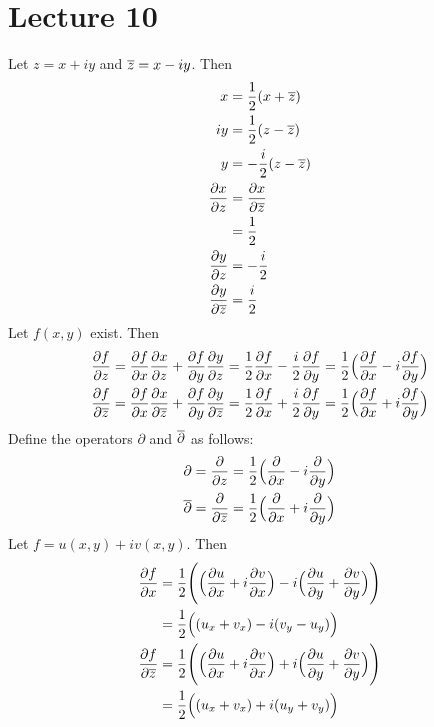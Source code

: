 \documentclass[12pt]{article}
\begin{document}
\section{Lecture 10} 
Let $z = x + iy$ and $\overline{z} = x - iy$. Then $$ \begin{aligned} x &= \frac{1}{2}(x + \overline{z}) \\ iy &= \frac{1}{2}(z - \overline{z}) \\ y &= -\frac{i}{2}(z - \overline{z}) \\ \frac{\partial x}{\partial z} &= \frac{\partial x}{\partial \overline{z}} \\&= \frac{1}{2} \\ \frac{\partial y}{\partial z} &= -\frac{i}{2} \\ \frac{\partial y}{\partial \overline{z}} &= \frac{i}{2} \end{aligned} $$ 
Let $f(x,y)$ exist. Then $$ \begin{aligned} 
\frac{\partial f}{\partial z} &= \frac{\partial f}{\partial x}\frac{\partial x}{\partial z} + \frac{\partial f}{\partial y} \frac{\partial y}{\partial z} = \frac{1}{2} \frac{\partial f}{\partial x} - \frac{i}{2}\frac{\partial f}{\partial y} = \frac{1}{2} \Big( \frac{\partial f}{\partial x} - i\frac{\partial f}{\partial y}\Big) \\
\frac{\partial f}{\partial \overline{z}} &= \frac{\partial f}{\partial x} \frac{\partial x}{\partial \overline{z}} + \frac{\partial f}{\partial y}\frac{\partial y}{\partial \overline{z}} = \frac{1}{2} \frac{\partial f}{\partial x} + \frac{i}{2}\frac{\partial f}{\partial y} = \frac{1}{2}\Big( \frac{\partial f}{\partial x} + i \frac{\partial f}{\partial y}\Big) \end{aligned} $$ 
Define the operators $\partial$ and $\overline{\partial}$ as follows: 
$$ \begin{aligned} \partial &= \frac{\partial}{\partial z} = \frac{1}{2} \Big( \frac{\partial}{\partial x} - i \frac{\partial}{\partial y}\Big) \\ \overline{\partial} &= \frac{\partial}{\partial \overline{z}} = \frac{1}{2}\Big( \frac{\partial}{\partial x} + i\frac{\partial}{\partial y}\Big) \end{aligned}$$ 
Let $f = u(x,y) + iv(x,y)$. Then $$ \begin{aligned} 
\frac{\partial f}{\partial x} &= \frac{1}{2} \Bigg( \Big( \frac{\partial u}{\partial x} + i \frac{\partial v}{\partial x}\Big) - i \Big( \frac{\partial u}{\partial y} + \frac{\partial v}{\partial y}\Big)\Bigg) \\ &=
\frac{1}{2}\Big( (u_x + v_x) - i(v_y - u_y)\Big) \\ \frac{\partial f}{\partial \overline{z}} &= \frac{1}{2} \Bigg( \Big( \frac{\partial u}{\partial x} + i \frac{\partial v}{\partial x} \Big) + i \Big( \frac{\partial u}{\partial y} + \frac{\partial v}{\partial y}\Big)\Bigg) \\ &= \frac{1}{2} \Big( (u_x + v_x) + i(u_y + v_y) \Big) \end{aligned} $$ 
\end{document}

